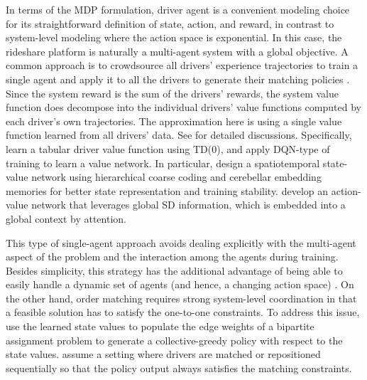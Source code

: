 \documentclass{article}
\newcommand{\tq}[1]{\textcolor{red}{#1}}
\begin{document}
In terms of the MDP formulation, driver agent is a convenient modeling choice for its straightforward definition of state, action, and reward, in contrast to system-level modeling where the action space is exponential. In this case, the rideshare platform is naturally a multi-agent system with a global objective. A common approach is to crowdsource all drivers' experience trajectories to train a single agent and apply it to all the drivers to generate their matching policies \citep{xu2018large,qin2018dispatching,tang2019deep}. Since the system reward is the sum of the drivers' rewards, the system value function does decompose into the individual drivers' value functions computed by each driver's own trajectories. The approximation here is using a single value function learned from all drivers' data. See \citep{qin2020ride} for detailed discussions. Specifically, \cite{xu2018large} learn a tabular driver value function using TD(0), and \cite{qin2018dispatching,tang2019deep,holler2019deep} apply DQN-type of training to learn a value network. In particular, \cite{tang2019deep} design a spatiotemporal state-value network using hierarchical coarse coding and cerebellar embedding memories for better state representation and training stability. \cite{holler2019deep} develop an action-value network that leverages global SD information, which is embedded into a global context by attention.

This type of single-agent approach avoids dealing explicitly with the multi-agent aspect of the problem and the interaction among the agents during training. Besides simplicity, this strategy has the additional advantage of being able to easily handle a dynamic set of agents (and hence, a changing action space) \citep{ke2020learning}. On the other hand, order matching requires strong system-level coordination in that a feasible solution has to satisfy the one-to-one constraints. To address this issue, \cite{xu2018large,tang2019deep} use the learned state values to populate the edge weights of a bipartite assignment problem to generate a collective-greedy policy \citep{qin2020ride} with respect to the state values.  \cite{holler2019deep} assume a setting where drivers are matched or repositioned sequentially so that the policy output always satisfies the matching constraints.
\end{document}
